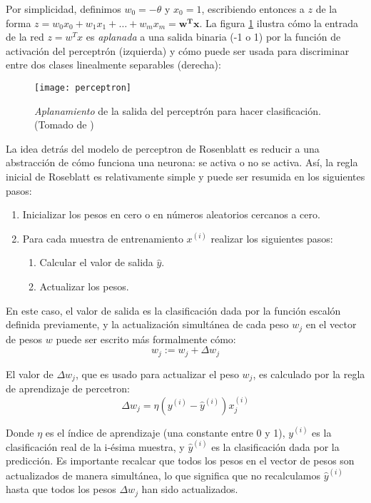 Por simplicidad, definimos $w_0=-\theta$ y $x_0=1$, escribiendo
entonces a $z$ de la forma $z=w_0x_0 + w_1x_1 + \dots + w_mx_m =
\mathbf{w^Tx}$.  La figura \ref{fig:binary} ilustra cómo la entrada de
la red $z=w^Tx$ es \textit{aplanada} a una salida binaria (-1 o 1) por
la función de activación del perceptrón (izquierda) y cómo puede ser
usada para discriminar entre dos clases linealmente separables
(derecha):
\begin{figure}[H]
  \texttt{[image: perceptron]} \centering
  \caption{\textit{Aplanamiento} de la salida del perceptrón para
    hacer clasificación.  (Tomado de \cite{python})}
  \label{fig:binary}
\end{figure}

La idea detrás del modelo de perceptron de Rosenblatt es reducir a una
abstracción de cómo funciona una neurona: se activa o no se
activa. Así, la regla inicial de Roseblatt es relativamente simple y
puede ser resumida en los siguientes pasos:
\begin{enumerate}
  \item Inicializar los pesos en cero o en números aleatorios cercanos
    a cero.
  \item Para cada muestra de entrenamiento $x^{(i)}$ realizar los
    siguientes pasos:
  \begin{enumerate}
    \item Calcular el valor de salida $\hat y$.
    \item Actualizar los pesos.
  \end{enumerate}
\end{enumerate}


En este caso, el valor de salida es la clasificación dada por la
función escalón definida previamente, y la actualización simultánea de
cada peso $w_j$ en el vector de pesos $w$ puede ser escrito más
formalmente cómo:
\begin{equation}
  w_j := w_j + \Delta w_j
\end{equation}

El valor de $\Delta w_j$, que es usado para actualizar el peso $w_j$,
es calculado por la regla de aprendizaje de percetron:
\begin{equation}
  \Delta w_j = \eta (y^{(i)} - \hat y^{(i)})x^{(i)}_j
\end{equation}

Donde $\eta$ es el índice de aprendizaje (una constante entre 0 y 1),
$y^{(i)}$ es la clasificación real de la i-ésima muestra, y $\hat
y^{(i)}$ es la clasificación dada por la predicción. Es importante
recalcar que todos los pesos en el vector de pesos son actualizados de
manera simultánea, lo que significa que no recalculamos $\hat y^{(i)}$
hasta que todos los pesos $\Delta w_j$ han sido actualizados.

